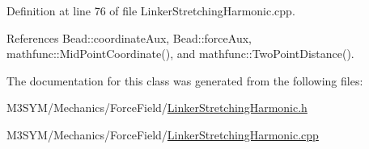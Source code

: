 Definition at line 76 of file Linker\+Stretching\+Harmonic.\+cpp.



References Bead\+::coordinate\+Aux, Bead\+::force\+Aux, mathfunc\+::\+Mid\+Point\+Coordinate(), and mathfunc\+::\+Two\+Point\+Distance().



The documentation for this class was generated from the following files\+:\begin{DoxyCompactItemize}
\item 
M3\+S\+Y\+M/\+Mechanics/\+Force\+Field/\hyperlink{LinkerStretchingHarmonic_8h}{Linker\+Stretching\+Harmonic.\+h}\item 
M3\+S\+Y\+M/\+Mechanics/\+Force\+Field/\hyperlink{LinkerStretchingHarmonic_8cpp}{Linker\+Stretching\+Harmonic.\+cpp}\end{DoxyCompactItemize}
